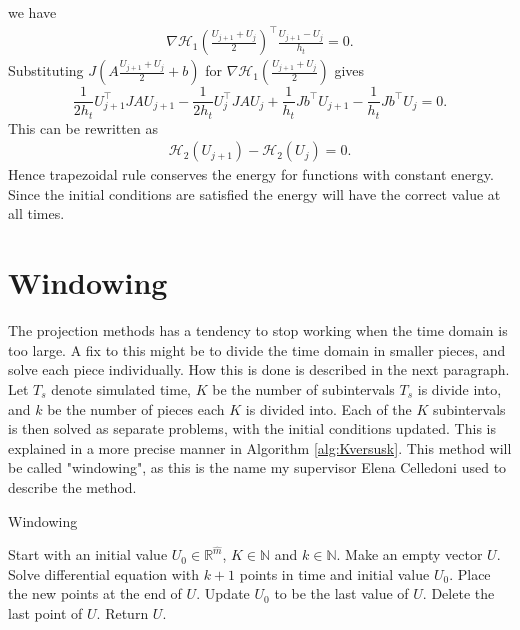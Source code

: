 \noindent we have
\begin{equation*}
\begin{aligned}
\nabla \mathcal{H}_1 (\frac{U_{j+1}  + U_j}{2}) ^\top \frac{U_{j+1} - U_j}{ h_t } = 0.
\end{aligned}
\end{equation*}
\noindent Substituting $ J (A\frac{U_{j+1}  + U_j}{2}  + b) $ for $\nabla \mathcal{H}_1 (\frac{U_{j+1}  + U_j}{2})$ gives
\begin{equation*}
\frac{1}{2 h_t} U_{j+1}^\top JAU_{j+1} %
- \frac{1}{2 h_t} U_{j}^\top JAU_{j} + \frac{1}{h_t} Jb^\top U_{j+1} -\frac{1}{h_t} Jb^\top U_{j} = 0.
\end{equation*}
This can be rewritten as
\begin{equation*}
\begin{aligned}
\mathcal{H}_2(U_{j+1}) - \mathcal{H}_2(U_{j}) = 0.
\end{aligned}
\end{equation*}
\noindent Hence trapezoidal rule conserves the energy for functions with constant energy. Since the initial conditions are satisfied the energy will have the correct value at all times.

\section{Windowing}%
\noindent The projection methods has a tendency to stop working when the time domain is too large. A fix to this might be to divide the time domain in smaller pieces, and solve each piece individually. How this is done is described in the next paragraph.\\ 

\noindent Let $T_s$ denote simulated time, $K$ be the number of subintervals $T_s$ is divide into, and $k$ be the number of pieces each $K$ is divided into. Each of the $K$ subintervals is then solved as separate problems, with the initial conditions updated. This is explained in a more precise manner in Algorithm \ref{alg:Kversusk}. This method will be called "windowing", as this is the name my supervisor Elena Celledoni \cite{elenaperson} used to describe the method.

\begin{algorithm} [h!]
\begin{algorithmic} \caption{ Windowing } \label{alg:Kversusk}  
\STATE Start with an initial value $U_0 \in \mathbb{R}^{\hat{m}}$, $K \in \mathbb{N}$ and $k \in \mathbb{N}$.
\STATE Make an empty vector $U$.
   \STATE Solve differential equation with $k+1$ points in time and initial value $U_0$.
   \STATE Place the new points at the end of $U$.
   \STATE Update $U_0$ to be the last value of $U$.
   \STATE Delete the last point of $U$.
\ENDFOR
\STATE Return $U$.
\end{algorithmic} 
\end{algorithm}

